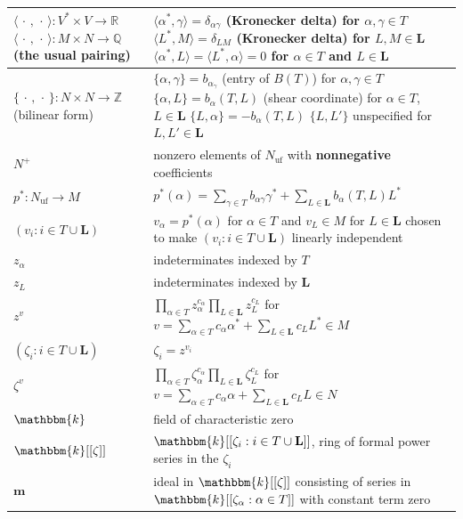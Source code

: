 \documentclass{amsart}
\theoremstyle{definition}
\theoremstyle{remark}
\numberwithin{equation}{section}
\newcommand{\integers}{\mathbb Z}
\newcommand{\rationals}{\mathbb Q}
\newcommand{\reals}{\mathbb R}
\newcommand{\uf}{{\operatorname{uf}}}
\newcommand{\set}[1]{{\lbrace #1 \rbrace}}
\newcommand{\br}[1]{{\langle #1 \rangle}}
\newcommand{\0}{{\mathbf{0}}}
\newcommand{\m}{\mathbf{m}}
\renewcommand{\k}{\mathbbm{k}}
\renewcommand{\L}{\mathbf{L}}
\begin{document}
\begin{longtable}{P{88.5pt}|P{248pt}}
$\br{\,\cdot\,,\,\cdot\,}:V^*\times V\to\reals$\linebreak
$\br{\,\cdot\,,\,\cdot\,}:M\times N\to\rationals$\linebreak
(the usual pairing)& 
$\br{\alpha^*,\gamma}=\delta_{\alpha\gamma}$ (Kronecker delta) for $\alpha,\gamma\in T$\linebreak
$\br{L^*,M}=\delta_{LM}$ (Kronecker delta) for $L,M\in\L$\linebreak
$\br{\alpha^*,L}=\br{L^*,\alpha}=0$ for $\alpha\in T$ and $L\in\L$
\\\hline
$\set{\,\cdot\,,\,\cdot\,}:N\times N\to\integers$\linebreak
(bilinear form)&$\set{\alpha,\gamma}=b_{\alpha_\gamma}$ (entry of $B(T)$) for $\alpha,\gamma\in T$\linebreak
$\set{\alpha,L}=b_\alpha(T,L)$ (shear coordinate) for $\alpha\in T$, $L\in\L$\linebreak
$\set{L,\alpha}=-b_\alpha(T,L)$\linebreak
$\set{L,L'}$ unspecified for $L,L'\in\L$
\\\hline
$N^+$& nonzero elements of $N_\uf$ with \textbf{nonnegative} coefficients\\\hline
$p^*:N_\uf\to M$&
$p^*(\alpha)=\sum_{\gamma\in T}b_{\alpha\gamma}\gamma^*+\sum_{L\in\L}b_\alpha(T,L)L^*$\\\hline
$(v_i:i\in T\cup\L)$&$v_\alpha=p^*(\alpha)$ for $\alpha\in T$ and
$v_L\in M$ for $L\in\L$ chosen to make $(v_i:i\in T\cup\L)$ linearly independent
\\\hline
$z_\alpha$&indeterminates indexed by $T$\\\hline
$z_L$&indeterminates indexed by $\L$\\\hline
$z^v$&$\displaystyle\prod_{\alpha\in T}z_\alpha^{c_\alpha}\prod_{L\in\L}z_L^{c_L}$ for $\displaystyle v=\sum_{\alpha\in T}c_\alpha\alpha^*+\sum_{L\in\L}c_LL^*\in M$\\\hline
$(\zeta_i:i\in T\cup\L)$&$\zeta_i=z^{v_i}$\\\hline
$\zeta^v$&$\displaystyle\prod_{\alpha\in T}\zeta_\alpha^{c_\alpha}\prod_{L\in\L}\zeta_L^{c_L}$ for $\displaystyle v=\sum_{\alpha\in T}c_\alpha\alpha+\sum_{L\in\L}c_LL\in N$\\\hline
$\k$&field of characteristic zero\\\hline
$\k[[\zeta]]$&$\k[[\zeta_i:i\in T\cup\L]]$, ring of formal power series in the $\zeta_i$\\\hline
$\m$&ideal in $\k[[\zeta]]$ consisting of series in $\k[[\zeta_\alpha:\alpha\in T]]$ with constant term zero\\\hline
\end{longtable}
\end{document}
